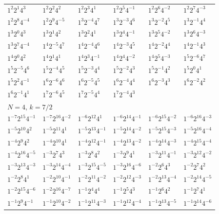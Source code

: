 \documentclass[12pt]{amsart}
\numberwithin{equation}{section}
\theoremstyle{plain}
\theoremstyle{definition}
\theoremstyle{remark}
\begin{document}
\begin{longtable}{llllll}
$1^{2}2^{1}4^{3}$ & $1^{2}2^{2}4^{2}$ & $1^{2}2^{3}4^{1}$ & $1^{2}2^{5}4^{-1}$ & $1^{2}2^{6}4^{-2}$ & $1^{2}2^{7}4^{-3}$\\
$1^{2}2^{8}4^{-4}$ & $1^{2}2^{9}4^{-5}$ & $1^{3}2^{-4}4^{7}$ & $1^{3}2^{-3}4^{6}$ & $1^{3}2^{-2}4^{5}$ & $1^{3}2^{-1}4^{4}$\\
$1^{3}2^{0}4^{3}$ & $1^{3}2^{1}4^{2}$ & $1^{3}2^{2}4^{1}$ & $1^{3}2^{4}4^{-1}$ & $1^{3}2^{5}4^{-2}$ & $1^{3}2^{6}4^{-3}$\\
$1^{3}2^{7}4^{-4}$ & $1^{4}2^{-5}4^{7}$ & $1^{4}2^{-4}4^{6}$ & $1^{4}2^{-3}4^{5}$ & $1^{4}2^{-2}4^{4}$ & $1^{4}2^{-1}4^{3}$\\
$1^{4}2^{0}4^{2}$ & $1^{4}2^{1}4^{1}$ & $1^{4}2^{3}4^{-1}$ & $1^{4}2^{4}4^{-2}$ & $1^{4}2^{5}4^{-3}$ & $1^{5}2^{-6}4^{7}$\\
$1^{5}2^{-5}4^{6}$ & $1^{5}2^{-4}4^{5}$ & $1^{5}2^{-3}4^{4}$ & $1^{5}2^{-2}4^{3}$ & $1^{5}2^{-1}4^{2}$ & $1^{5}2^{0}4^{1}$\\
$1^{5}2^{2}4^{-1}$ & $1^{6}2^{-6}4^{6}$ & $1^{6}2^{-5}4^{5}$ & $1^{6}2^{-4}4^{4}$ & $1^{6}2^{-3}4^{3}$ & $1^{6}2^{-2}4^{2}$\\
$1^{6}2^{-1}4^{1}$ & $1^{7}2^{-6}4^{5}$ & $1^{7}2^{-5}4^{4}$ & $1^{7}2^{-4}4^{3}$ & &\\
\midrule
\multicolumn{6}{l}{$N=4$, $k=7/2$}\\
$1^{-7}2^{15}4^{-1}$ & $1^{-7}2^{16}4^{-2}$ & $1^{-6}2^{12}4^{1}$ & $1^{-6}2^{14}4^{-1}$ & $1^{-6}2^{15}4^{-2}$ & $1^{-6}2^{16}4^{-3}$\\
$1^{-5}2^{10}4^{2}$ & $1^{-5}2^{11}4^{1}$ & $1^{-5}2^{13}4^{-1}$ & $1^{-5}2^{14}4^{-2}$ & $1^{-5}2^{15}4^{-3}$ & $1^{-5}2^{16}4^{-4}$\\
$1^{-4}2^{9}4^{2}$ & $1^{-4}2^{10}4^{1}$ & $1^{-4}2^{12}4^{-1}$ & $1^{-4}2^{13}4^{-2}$ & $1^{-4}2^{14}4^{-3}$ & $1^{-4}2^{15}4^{-4}$\\
$1^{-4}2^{16}4^{-5}$ & $1^{-3}2^{7}4^{3}$ & $1^{-3}2^{8}4^{2}$ & $1^{-3}2^{9}4^{1}$ & $1^{-3}2^{11}4^{-1}$ & $1^{-3}2^{12}4^{-2}$\\
$1^{-3}2^{13}4^{-3}$ & $1^{-3}2^{14}4^{-4}$ & $1^{-3}2^{15}4^{-5}$ & $1^{-3}2^{16}4^{-6}$ & $1^{-2}2^{6}4^{3}$ & $1^{-2}2^{7}4^{2}$\\
$1^{-2}2^{8}4^{1}$ & $1^{-2}2^{10}4^{-1}$ & $1^{-2}2^{11}4^{-2}$ & $1^{-2}2^{12}4^{-3}$ & $1^{-2}2^{13}4^{-4}$ & $1^{-2}2^{14}4^{-5}$\\
$1^{-2}2^{15}4^{-6}$ & $1^{-2}2^{16}4^{-7}$ & $1^{-1}2^{4}4^{4}$ & $1^{-1}2^{5}4^{3}$ & $1^{-1}2^{6}4^{2}$ & $1^{-1}2^{7}4^{1}$\\
$1^{-1}2^{9}4^{-1}$ & $1^{-1}2^{10}4^{-2}$ & $1^{-1}2^{11}4^{-3}$ & $1^{-1}2^{12}4^{-4}$ & $1^{-1}2^{13}4^{-5}$ & $1^{-1}2^{14}4^{-6}$\\

\end{longtable}
\end{document}
